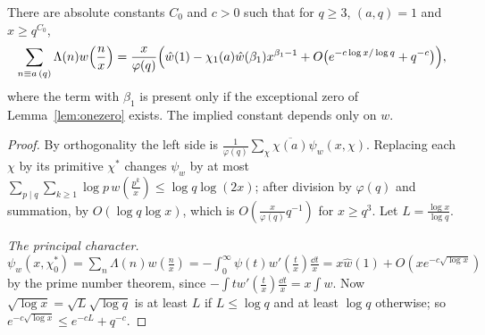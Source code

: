 \begin{theorem}[Gallagher, 1970]\label{thm:gallagher}
There are absolute constants $C_0$ and $c>0$ such that for $q\ge3$, $(a,q)=1$ and $x\ge q^{C_0}$,
\[
\sum_{n\equiv a\,(q)}\Lambda(n)w\Bigl(\frac nx\Bigr)=\frac x{\varphi(q)}\Bigl(\hat w(1)-\chi_1(a)\hat w(\beta_1)x^{\beta_1-1}+O\bigl(e^{-c\log x/\log q}+q^{-c}\bigr)\Bigr),
\]
where the term with $\beta_1$ is present only if the exceptional zero of Lemma~\ref{lem:onezero} exists. The implied constant depends only on $w$.
\end{theorem}
\begin{proof}
By orthogonality the left side is $\frac1{\varphi(q)}\sum_\chi\overline{\chi(a)}\psi_w(x,\chi)$. Replacing each $\chi$ by its primitive $\chi^*$ changes $\psi_w$ by at most $\sum_{p\mid q}\sum_{k\ge1}\log p\,w(\frac{p^k}x)\le\log q\log(2x)$; after division by $\varphi(q)$ and summation, by $O(\log q\log x)$, which is $O(\frac x{\varphi(q)}q^{-1})$ for $x\ge q^3$. Let $L=\frac{\log x}{\log q}$.

\emph{The principal character.} $\psi_w(x,\chi_0^*)=\sum_n\Lambda(n)w(\frac nx)=-\int_0^\infty\psi(t)w'(\frac tx)\frac{\dd t}x=x\hat w(1)+O(xe^{-c\sqrt{\log x}})$ by the prime number theorem, since $-\int tw'(\frac tx)\frac{\dd t}x=x\int w$. Now $\sqrt{\log x}=\sqrt{L}\sqrt{\log q}$ is at least $L$ if $L\le\log q$ and at least $\log q$ otherwise; so $e^{-c\sqrt{\log x}}\le e^{-cL}+q^{-c}$.


\end{proof}
